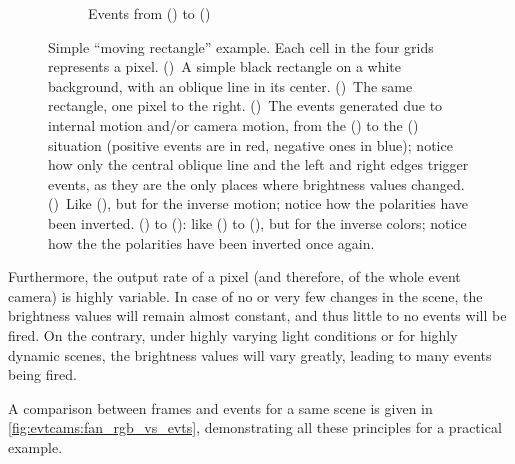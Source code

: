 \begin{figure}
\begin{subfigure}{0.475\linewidth}
    \caption{Events from () to ()}\label{subfig:evtcams:evts_rel_motion:white_af_to_bf}
  \end{subfigure}
  \caption{Simple ``moving rectangle'' example. Each cell in the four grids represents a pixel. ()~A simple black rectangle on a white background, with an oblique line in its center. ()~The same rectangle, one pixel to the right. ()~The events generated due to internal motion and/or camera motion, from the () to the () situation ({\color{red}positive} events are in {\color{red}red}, {\color{blue}negative} ones in {\color{blue}blue}); notice how only the central oblique line and the left and right edges trigger events, as they are the only places where brightness values changed. ()~Like (), but for the inverse motion; notice how the polarities have been inverted. () to (): like () to (), but for the inverse colors; notice how the the polarities have been inverted once again.}\label{fig:evtcams:evts_rel_motion}
\end{figure}

Furthermore, the output rate of a pixel (and therefore, of the whole event camera) is highly variable. In case of no or very few changes in the scene, the brightness values will remain almost constant, and thus little to no events will be fired. On the contrary, under highly varying light conditions or for highly dynamic scenes, the brightness values will vary greatly, leading to many events being fired.

A comparison between frames and events for a same scene is given in \cref{fig:evtcams:fan_rgb_vs_evts}, demonstrating all these principles for a practical example.

